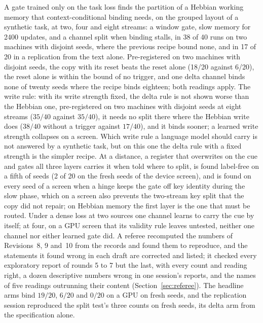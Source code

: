 \documentclass[11pt]{article}
\begin{document}
A gate trained only on the task loss finds the partition of a Hebbian working memory that context-conditional binding needs, on the grouped layout of a synthetic task, at two, four and eight streams: a window gate, slow memory for 2400 updates, and a channel split when binding stalls, in 38 of 40 runs on two machines with disjoint seeds, where the previous recipe bound none, and in 17 of 20 in a replication from the text alone. Pre-registered on two machines with disjoint seeds, the copy with its reset beats the reset alone (18/20 against 6/20), the reset alone is within the bound of no trigger, and one delta channel binds none of twenty seeds where the recipe binds eighteen; both readings apply. The write rule: with its write strength fixed, the delta rule is not shown worse than the Hebbian one, pre-registered on two machines with disjoint seeds at eight streams ($35/40$ against $35/40$), it needs no split there where the Hebbian write does ($38/40$ without a trigger against $17/40$), and it binds sooner; a learned write strength collapses on a screen. Which write rule a language model should carry is not answered by a synthetic task, but on this one the delta rule with a fixed strength is the simpler recipe. At a distance, a register that overwrites on the cue and gates all three layers carries it when told where to split, is found label-free on a fifth of seeds (2 of 20 on the fresh seeds of the device screen), and is found on every seed of a screen when a hinge keeps the gate off key identity during the slow phase, which on a screen also prevents the two-stream key split that the copy did not repair; on Hebbian memory the first layer is the one that must be routed. Under a dense loss at two sources one channel learns to carry the cue by itself; at four, on a GPU screen that its validity rule leaves untested, neither one channel nor either learned gate did. A referee recomputed the numbers of Revisions~8, 9 and~10 from the records and found them to reproduce, and the statements it found wrong in each draft are corrected and listed; it checked every exploratory report of rounds 5 to 7 but the last, with every count and reading right, a dozen descriptive numbers wrong in one session's reports, and the names of five readings outrunning their content (Section~\ref{sec:referee}). The headline arms bind $19/20$, $6/20$ and $0/20$ on a GPU on fresh seeds, and the replication session reproduced the split test's three counts on fresh seeds, its delta arm from the specification alone.
\end{document}
